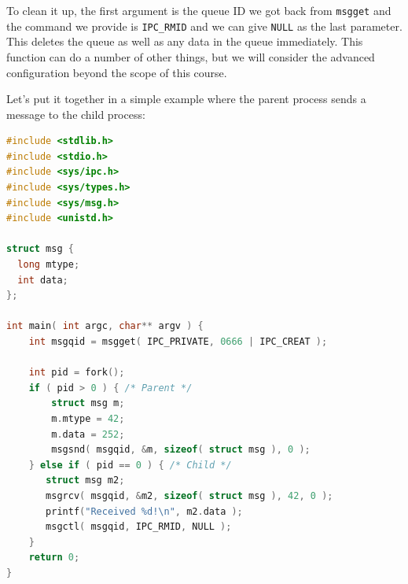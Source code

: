 To clean it up, the first argument is the queue ID we got back from \texttt{msgget} and the command we provide is \texttt{IPC\_RMID} and we can give \texttt{NULL} as the last parameter. This deletes the queue as well as any data in the queue immediately. This function can do a number of other things, but we will consider the advanced configuration beyond the scope of this course.

Let's put it together in a simple example where the parent process sends a message to the child process:
\begin{lstlisting}[language=C]
#include <stdlib.h>
#include <stdio.h>
#include <sys/ipc.h>
#include <sys/types.h>
#include <sys/msg.h>
#include <unistd.h>

struct msg {
  long mtype;
  int data;
};

int main( int argc, char** argv ) { 
    int msgqid = msgget( IPC_PRIVATE, 0666 | IPC_CREAT );

    int pid = fork();
    if ( pid > 0 ) { /* Parent */
        struct msg m;
        m.mtype = 42; 
        m.data = 252;
        msgsnd( msgqid, &m, sizeof( struct msg ), 0 );
    } else if ( pid == 0 ) { /* Child */
       struct msg m2; 
       msgrcv( msgqid, &m2, sizeof( struct msg ), 42, 0 );
       printf("Received %d!\n", m2.data );
       msgctl( msgqid, IPC_RMID, NULL );
    }   
    return 0;
}
\end{lstlisting}



